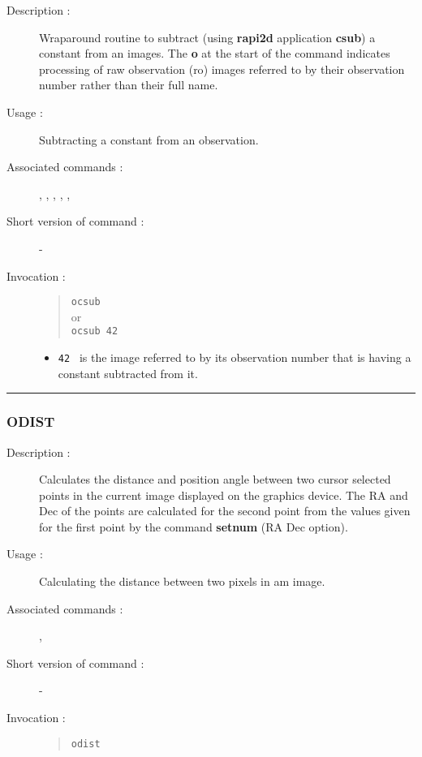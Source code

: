 \begin{description}

\item[Description :] Wraparound routine to subtract (using {\bf rapi2d}
application {\bf csub}) a constant from an images. The {\bf o} at the
start of the command indicates processing of raw observation ({\sc ro})
images referred to by their observation number rather than their full
name.

\item[Usage :] Subtracting a constant from an observation.

\item[Associated commands :] {\tt {}}, 
{\tt {}}, {\tt {}}, 
{\tt {}}, {\tt {}}, 
{\tt {}}

\item[Short version of command :] -
\item[Invocation :]

\begin{quote}{\tt  ocsub }\\
or \\
{\tt ocsub 42 }
\end{quote}

\begin{itemize}

\item {\tt 42 } is the image referred to by its observation number that
  is having a constant subtracted from it.
\end{itemize}

\end{description}

\hrule 
\subsubsection*{\label{ODIST}ODIST}

\begin{description}

\item[Description :] Calculates the distance and position angle between
two cursor selected points in the current image displayed on the
graphics device.  The RA and Dec of the points are calculated for the
second point from the values given for the first point by the command
{\bf setnum} (RA Dec option).

\item[Usage :] Calculating the distance between two pixels in am image.
\item[Associated commands :] {\tt {}}, 
{\tt {}}
\item[Short version of command :] -
\item[Invocation :]

\begin{quote}{\tt  odist }\end{quote}

\end{description}

